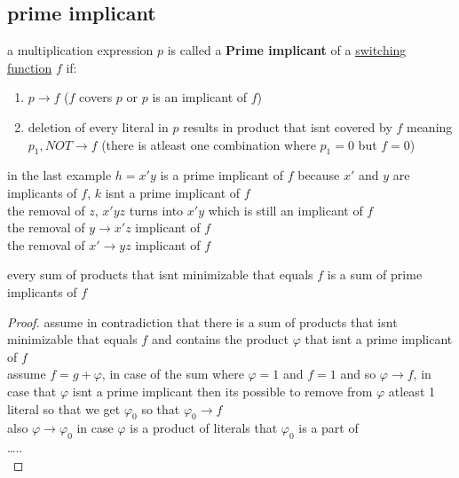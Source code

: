 \documentclass[a4paper,12pt]{article}
\begin{document}
\subsection{prime implicant}
\label{sec:org2137fb0}
a multiplication expression \(p\) is called a \textbf{Prime implicant} of a \hyperref[sec:org4e6eeb6]{switching function} \(f\) if:\\
\begin{enumerate}
\item \(p \rightarrow f\) (\(f\) covers \(p\) or \(p\) is an implicant of \(f\))\\
\item deletion of every literal in \(p\) results in product that isnt covered by \(f\) meaning \(p_1, NOT \rightarrow f\) (there is atleast one combination where \(p_1 = 0\) but \(f = 0\))\\
\end{enumerate}
in the last example \(h = x'y\) is a prime implicant of \(f\) because \(x'\) and \(y\) are implicants of \(f\), \(k\) isnt a prime implicant of \(f\)\\
the removal of \(z\), \(x'yz\) turns into \(x'y\) which is still an implicant of \(f\)\\
the removal of \(y \rightarrow x'z\) implicant of \(f\)\\
the removal of \(x' \rightarrow yz\) implicant of \(f\)\\
\begin{lemma}
every sum of products that isnt minimizable that equals \(f\) is a sum of prime implicants of \(f\)\\
\begin{proof}
assume in contradiction that there is a sum of products that isnt minimizable that equals \(f\) and contains the product \(\varphi\) that isnt a prime implicant of \(f\)\\
assume \(f = g + \varphi\), in case of the sum where \(\varphi = 1\) and \(f = 1\) and so \(\varphi \rightarrow f\), in case that \(\varphi\) isnt a prime implicant then its possible to remove from \(\varphi\) atleast 1 literal so that we get \(\varphi_0\) so that \(\varphi_0 \rightarrow f\)\\
also \(\varphi \rightarrow \varphi_0\) in case \(\varphi\) is a product of literals that \(\varphi_0\) is a part of\\
\ldots{}..\\
\end{proof}
\end{lemma}
\end{document}
